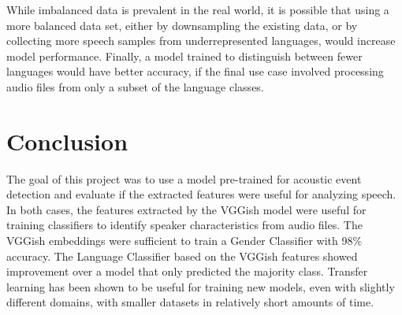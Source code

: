 While imbalanced data is prevalent in the real world, it is possible that using a more balanced data set, either by downsampling the existing data, or by collecting more speech samples from underrepresented languages, would increase model performance. Finally, a model trained to distinguish between fewer languages would have better accuracy, if the final use case involved processing audio files from only a subset of the language classes.
\section{Conclusion}
The goal of this project was to use a model pre-trained for acoustic event detection and evaluate if the extracted features were useful for analyzing speech. In both cases, the features extracted by the VGGish model were useful for training classifiers to identify speaker characteristics from audio files. The VGGish embeddings were sufficient to train a Gender Classifier with 98\% accuracy. The Language Classifier based on the VGGish features showed improvement over a model that only predicted the majority class. Transfer learning has been shown to be useful for training new models, even with slightly different domains, with smaller datasets in relatively short amounts of time.